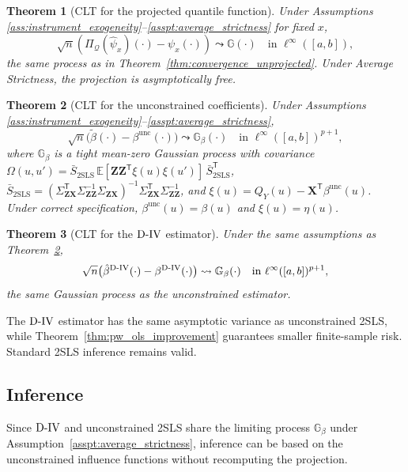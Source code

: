 \documentclass[12pt]{article}
\newcommand{\E}{\mathbb{E}}
\newcommand{\T}{\mathsf{T}} %
\newcommand{\est}{\ensuremath{\textnormal{D-IV}}\xspace}
\newtheorem{theorem}{Theorem}
\begin{document}
\begin{theorem}[CLT for the projected quantile function] \label{thm:convergence_projected}
Under Assumptions \ref{ass:instrument_exogeneity}--\ref{asspt:average_strictness} for fixed $x$,
\[
\sqrt{n}\left( \Pi_{\mathcal{Q}}(\hat{\psi}_x)(\cdot) - \psi_x(\cdot) \right) \leadsto \mathbb{G}(\cdot)  \quad \text{in } \ell^\infty([a,b]),
\]
the same process as in Theorem~\ref{thm:convergence_unprojected}. Under Average Strictness, the projection is asymptotically free.
\end{theorem}

\begin{theorem}[CLT for the unconstrained coefficients] \label{thm:convergence_beta}
Under Assumptions \ref{ass:instrument_exogeneity}--\ref{asspt:average_strictness},
\[
\sqrt{n}\big(\tilde{\beta}(\cdot) - \beta^{\text{unc}}(\cdot)\big) \leadsto \mathbb{G}_{\beta}(\cdot) \quad \text{in } \ell^\infty([a,b])^{p+1},
\]
where $\mathbb{G}_{\beta}$ is a tight mean-zero Gaussian process with covariance
$\Omega(u, u') = \bar{S}_{\mathrm{2SLS}} \, \E[\mathbf{Z}\mathbf{Z}^{\T} \xi(u)\xi(u')] \, \bar{S}_{\mathrm{2SLS}}^{\T}$, $\bar{S}_{\mathrm{2SLS}} = (\Sigma_{\mathbf{Z}\mathbf{X}}^{\!\T}\Sigma_{\mathbf{Z}\mathbf{Z}}^{-1}\Sigma_{\mathbf{Z}\mathbf{X}})^{-1}\Sigma_{\mathbf{Z}\mathbf{X}}^{\!\T}\Sigma_{\mathbf{Z}\mathbf{Z}}^{-1}$, and $\xi(u) = Q_Y(u) - \mathbf{X}^{\!\T}\beta^{\text{unc}}(u)$. Under correct specification, $\beta^{\text{unc}}(u) = \beta(u)$ and $\xi(u) = \eta(u)$.
\end{theorem}

\begin{theorem}[CLT for the \est estimator]\label{thm:pw_ols_clt}
Under the same assumptions as Theorem~\ref{thm:convergence_beta},
\[
\sqrt{n}\big(\hat{\beta}^{\est}(\cdot) - \beta^{\est}(\cdot)\big) \leadsto \mathbb{G}_\beta(\cdot) \quad \text{in } \ell^\infty([a,b])^{p+1},
\]
the same Gaussian process as the unconstrained estimator. 
\end{theorem}

The \est estimator has the same asymptotic variance as unconstrained 2SLS, while Theorem~\ref{thm:pw_ols_improvement} guarantees smaller finite-sample risk. Standard 2SLS inference remains valid.


\subsection{Inference}

Since \est and unconstrained 2SLS share the limiting process $\mathbb{G}_\beta$ under Assumption~\ref{asspt:average_strictness}, inference can be based on the unconstrained influence functions without recomputing the projection.
\end{document}
